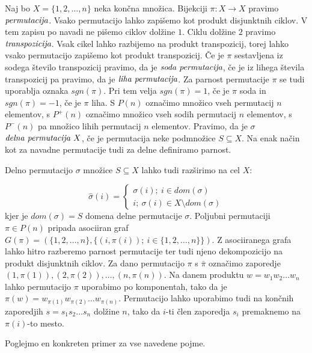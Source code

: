 \documentclass[mat1]{fmfdelo}
\newcommand{\pojem}[1]{\ensuremath{\emph{#1}}}
\newcommand{\map}[3]{\ensuremath{{#1}:{#2}\rightarrow{#3}}}
\begin{document}
\begin{definicija}
	Naj bo $X=\{1, 2, \ldots, n\}$ neka končna množica. Bijekciji $\map{\pi}{X}{X}$ pravimo \pojem{permutacija}. Vsako permutacijo lahko zapišemo kot produkt disjunktnih ciklov. V tem zapisu po navadi ne pišemo ciklov dolžine $1$. Ciklu dolžine $2$ pravimo \pojem{transpozicija}. Vsak cikel lahko razbijemo na produkt transpozicij, torej lahko vsako permutacijo zapišemo kot produkt transpozicij. Če je $\pi$ sestavljena iz sodega število transpozicij pravimo, da je \pojem{soda permutacija}, če je iz lihega števila transpozicij pa pravimo, da je \pojem{liha permutacija}. Za parnost permutacije $\pi$ se tudi uporablja oznaka $sgn(\pi)$. Pri tem velja $sgn(\pi)=1$, če je $\pi$ soda in $sgn(\pi) = -1$, če je $\pi$ liha. S $P(n)$ označimo množico vseh permutacij $n$ elementov, s $P^{+}(n)$ označimo množico vseh sodih permutacij $n$ elementov, s $P^{-}(n)$ pa množico lihih permutacij $n$ elementov. 
	Pravimo, da je $\sigma$ \pojem{delna permutacija $X$}, če je permutacija neke podmnožice $S\subseteq X$. Na enak način kot za navadne permutacije tudi za delne definiramo parnost.
	
	Delno permutacijo $\sigma$ množice $S\subseteq X$ lahko tudi razširimo na cel $X$:
	
	$$
	\hat{\sigma}(i) = \begin{cases*}
		\sigma(i);~i\in dom(\sigma) \\
		i;~\sigma(i) \in X\setminus dom(\sigma)
	\end{cases*}
	$$
	kjer je $dom(\sigma) = S$ domena delne permutacije $\sigma$.
	Poljubni permutaciji $\pi\in P(n)$ pripada asociiran graf $G(\pi) = (\{1, 2, \ldots, n\}, \{(i, \pi(i));~i\in \{1, 2, \ldots, n\}\})$. Z asociiranega grafa lahko hitro razberemo parnost permutacije ter tudi njeno dekompozicijo na produkt disjunktnih ciklov.
	Za dano permutacijo $\pi$ s $\bar{\pi}$ označimo zaporedje $(1, \pi(1)), (2, \pi(2)), \ldots, (n, \pi(n))$. Na danem produktu $w = w_1w_2\ldots w_n$ lahko permutacijo $\pi$ uporabimo po komponentah, tako da je $\pi(w) = w_{\pi(1)}w_{\pi(2)}\ldots w_{\pi(n)}$. Permutacijo lahko uporabimo tudi na končnih zaporedjih $s = s_1s_2\ldots s_n$ dolžine $n$, tako da $i$-ti člen zaporedja $s_i$ premaknemo na $\pi(i)$-to mesto.
\end{definicija}
Poglejmo en konkreten primer za vse navedene pojme.
\end{document}
